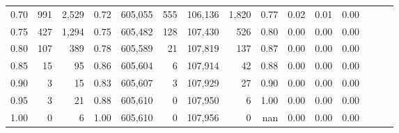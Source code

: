 \begin{tabular}{rrrrrrrrrrrrrrr}
0.70 &      991 &   2,529 &  0.72 &  605,055 &      555 &  106,136 &    1,820 &  0.77 &  0.02 &  0.01 &      0.00 \\
0.75 &      427 &   1,294 &  0.75 &  605,482 &      128 &  107,430 &      526 &  0.80 &  0.00 &  0.00 &      0.00 \\
0.80 &      107 &     389 &  0.78 &  605,589 &       21 &  107,819 &      137 &  0.87 &  0.00 &  0.00 &      0.00 \\
0.85 &       15 &      95 &  0.86 &  605,604 &        6 &  107,914 &       42 &  0.88 &  0.00 &  0.00 &      0.00 \\
0.90 &        3 &      15 &  0.83 &  605,607 &        3 &  107,929 &       27 &  0.90 &  0.00 &  0.00 &      0.00 \\
0.95 &        3 &      21 &  0.88 &  605,610 &        0 &  107,950 &        6 &  1.00 &  0.00 &  0.00 &      0.00 \\
1.00 &        0 &       6 &  1.00 &  605,610 &        0 &  107,956 &        0 &   nan &  0.00 &  0.00 &      0.00 \\
\bottomrule
\end{tabular}
